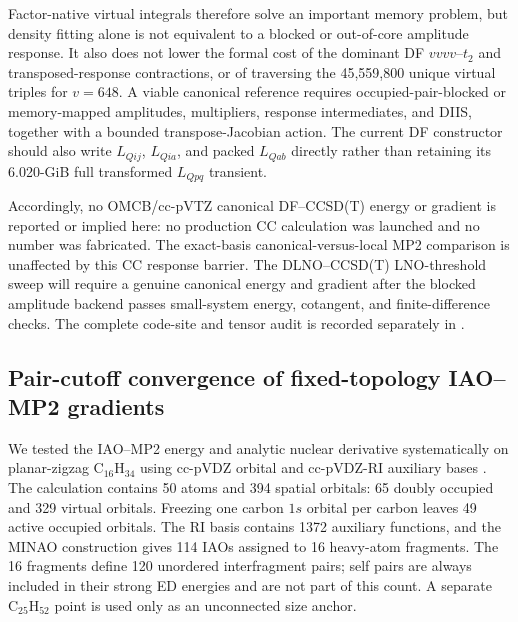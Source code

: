 \documentclass[11pt]{article}
\begin{document}
Factor-native virtual integrals therefore solve an important memory problem,
but density fitting alone is not equivalent to a blocked or out-of-core
amplitude response.  It also does not lower the formal cost of the dominant
DF $vvvv$--$t_2$ and transposed-response contractions, or of traversing the
45,559,800 unique virtual triples for $v=648$.  A viable canonical reference
requires occupied-pair-blocked or memory-mapped amplitudes, multipliers,
response intermediates, and DIIS, together with a bounded transpose-Jacobian
action.  The current DF constructor should also write $L_{Qij}$, $L_{Qia}$,
and packed $L_{Qab}$ directly rather than retaining its 6.020-GiB full
transformed $L_{Qpq}$ transient.

Accordingly, no OMCB/cc-pVTZ canonical DF--CCSD(T) energy or gradient is
reported or implied here: no production CC calculation was launched and no
number was fabricated.  The exact-basis canonical-versus-local MP2 comparison
is unaffected by this CC response barrier.  The DLNO--CCSD(T) LNO-threshold
sweep will require a genuine canonical energy and gradient after the blocked
amplitude backend passes small-system energy, cotangent, and finite-difference
checks.  The complete code-site and tensor audit is recorded separately in
.

\subsection{Pair-cutoff convergence of fixed-topology IAO--MP2 gradients}
\label{sec:pair-cutoff-results}

We tested the IAO--MP2 energy and analytic nuclear derivative systematically
on planar-zigzag $\mathrm{C}_{16}\mathrm{H}_{34}$ using cc-pVDZ orbital and
cc-pVDZ-RI auxiliary bases \cite{dunning1989,weigend2002}.  The calculation
contains 50 atoms and 394 spatial orbitals: 65 doubly occupied and 329 virtual
orbitals.  Freezing one carbon $1s$ orbital per carbon leaves 49 active
occupied orbitals.  The RI basis contains 1372 auxiliary functions, and the
MINAO construction gives 114 IAOs assigned to 16 heavy-atom fragments.  The
16 fragments define 120 unordered interfragment pairs; self pairs are always
included in their strong ED energies and are not part of this count.  A
separate $\mathrm{C}_{25}\mathrm{H}_{52}$ point is used only as an
unconnected size anchor.
\end{document}
